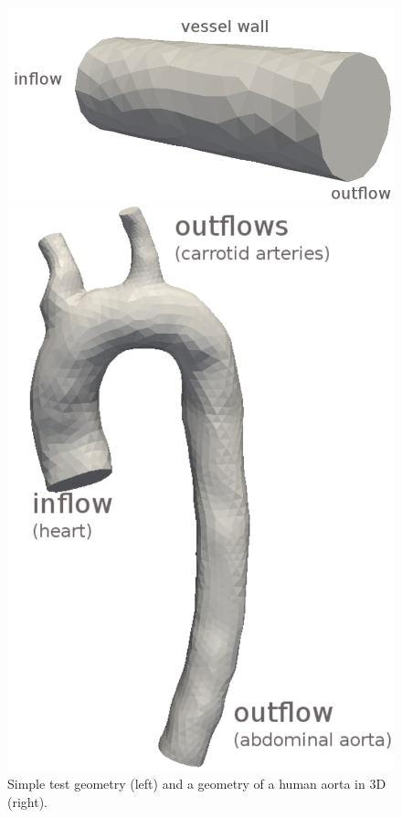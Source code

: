 \documentclass[a4paper, 11pt, twoside]{article}
\begin{document}
\begin{figure}[!h]
\centering
\begin{minipage}{0.45\textwidth}
\includegraphics[width=\textwidth]{fig/channel_gray.png}
\end{minipage}
\hspace{1.0cm}
\begin{minipage}{0.33\textwidth}
  \includegraphics[width=\textwidth]{fig/aorta_gray.png}
  \end{minipage}
\caption{Simple test geometry (left) and a geometry of a human aorta in 3D (right).}
\label{geometries}
\end{figure}
\end{document}
